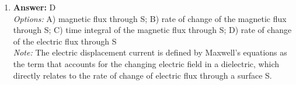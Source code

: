 \documentclass[12pt]{article}
\begin{document}
\begin{enumerate}[label=\arabic*.]
\\ \textit{Note:} The electric displacement current is defined by Maxwell's equations as the term that accounts for the changing electric field in a dielectric, which directly relates to the rate of change of electric flux through a surface S.
\item \textbf{Answer:} D
\\ \textit{Options:} A) magnetic flux through S; B) rate of change of the magnetic flux through S; C) time integral of the magnetic flux through S; D) rate of change of the electric flux through S
\\ \textit{Note:} The electric displacement current is defined by Maxwell's equations as the term that accounts for the changing electric field in a dielectric, which directly relates to the rate of change of electric flux through a surface S.
\end{enumerate}
\end{document}

